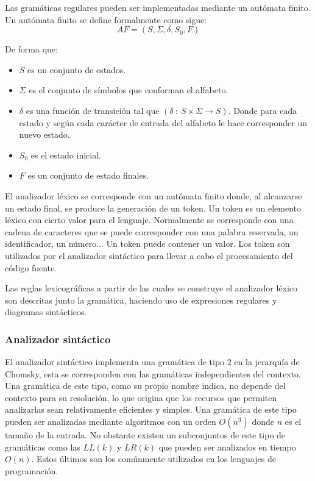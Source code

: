 Las gramáticas regulares pueden ser implementadas mediante un autómata finito. Un autómata finito se define formalmente como sigue:
$$AF = (S,\Sigma,\delta,S_0,F)$$

De forma que:
\begin{itemize}
\item $S$ es un conjunto de estados.
\item $\Sigma$ es el conjunto de símbolos que conforman el alfabeto.
\item $\delta$ es una función de transición tal que $(\delta\ :\ S\times\Sigma \rightarrow S)$. Donde para cada estado y según 
cada carácter de entrada del alfabeto le hace corresponder un nuevo estado.
\item $S_0$ es el estado inicial.
\item $F$ es un conjunto de estado finales.
\end{itemize}

El analizador léxico se corresponde con un autómata finito donde, al alcanzarse un estado final, se produce la generación de un token.
Un token es un elemento léxico con cierto valor para el lenguaje. Normalmente se corresponde con una cadena de
caracteres que se puede corresponder con una palabra reservada, un identificador, un número... Un token puede contener un 
valor. Los token son utilizados por el analizador sintáctico para llevar a cabo el procesamiento del código fuente. 

Las reglas lexicográficas a partir de las cuales se construye el analizador léxico son descritas junto la gramática, haciendo uso
de expresiones regulares y diagramas sintácticos.

\subsubsection{Analizador sintáctico}
El analizador sintáctico implementa una gramática de tipo 2 en la jerarquía de Chomsky, esta se corresponden con las 
gramáticas independientes del contexto. Una gramática de este tipo, como su propio nombre indica, no depende del contexto para
su resolución, lo que origina que los recursos que permiten analizarlas sean relativamente eficientes y simples. Una gramática de
este tipo pueden ser analizadas mediante algoritmos con un orden $O(n^3)$ donde $n$ es el tamaño de la entrada. No obstante existen 
un subconjuntos de este tipo de gramáticas como las $LL(k)$ y $LR(k)$ que pueden ser analizados en tiempo $O(n)$. Estos últimos son los
comúnmente utilizados en los lenguajes de programación.

